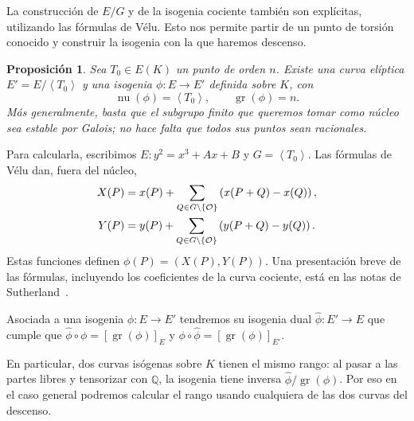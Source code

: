 \documentclass[a4paper]{book}
\theoremstyle{definition}
\theoremstyle{plain}
\newtheorem*{prop*}{Proposición}
\DeclareMathOperator{\gr}{gr}
\DeclareMathOperator{\nuc}{nu}
\newcommand{\QQ}{\mathbb{Q}}
\newcommand{\OO}{\mathcal{O}}
\newcommand{\lp}{\left\lparen}
\newcommand{\rp}{\right\rparen}
\newcommand{\lc}{\left<}
\newcommand{\rc}{\right>}
\newcommand{\lla}{\left\lbrace}
\newcommand{\rla}{\right\rbrace}
\begin{document}
La construcción de $E/G$ y de la isogenia cociente también son explícitas, utilizando las fórmulas de Vélu. Esto nos permite partir de un punto de torsión conocido y construir la isogenia con la que haremos descenso.

\begin{prop*}
Sea $T_0\in E(K)$ un punto de orden $n$. Existe una curva elíptica $E'=E/\lc T_0 \rc$ y una isogenia $\phi:E\to E'$ definida sobre $K$, con
\[
\nuc (\phi)=\lc T_0\rc,\qquad \gr(\phi)=n.
\]
Más generalmente, basta que el subgrupo finito que queremos tomar como núcleo sea estable por Galois; no hace falta que todos sus puntos sean racionales.
\end{prop*}

Para calcularla, escribimos $E:y^2=x^3+Ax+B$ y $G=\lc T_0\rc$. Las fórmulas de Vélu dan, fuera del núcleo,
\[
\begin{aligned}
X(P)&=x(P)+\sum_{Q\in G\setminus\lla\OO\rla}\lp x(P+Q)-x(Q)\rp,\\
Y(P)&=y(P)+\sum_{Q\in G\setminus\lla\OO\rla}\lp y(P+Q)-y(Q)\rp.
\end{aligned}
\]
Estas funciones definen $\phi(P)=(X(P),Y(P))$. Una presentación breve de las fórmulas, incluyendo los coeficientes de la curva cociente, está en las notas de Sutherland~\cite{Sutherland2023Isogenias}.

Asociada a una isogenia $\phi:E\to E'$ tendremos su isogenia dual $\hat\phi:E'\to E$ que cumple que $\hat\phi \circ \phi = {[\gr (\phi)]}_E$ y $\phi \circ \hat\phi= {[\gr (\phi)]}_{E'}$.

En particular, dos curvas isógenas sobre $K$ tienen el mismo rango: al pasar a las partes libres y tensorizar con $\QQ$, la isogenia tiene inversa $\hat\phi/\gr (\phi)$. Por eso en el caso general podremos calcular el rango usando cualquiera de las dos curvas del descenso. 
\end{document}

